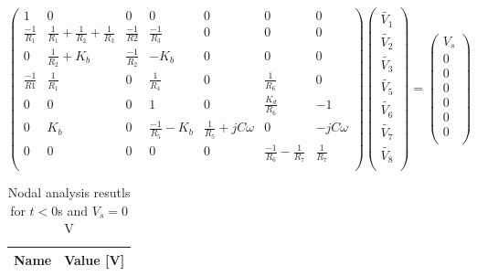 \begin{equation}
\begin{pmatrix}
1 & 0 & 0 & 0 & 0 & 0 & 0\\
\frac{-1}{R_1} & \frac{1}{R_1} + \frac{1}{R_2} + \frac{1}{R_3} & \frac{-1}{R2} & \frac{-1}{R_3} & 0 & 0 & 0\\
0 & \frac{1}{R_2} + K_b & \frac{-1}{R_2} & -K_b & 0 & 0 & 0\\
\frac{-1}{R1} & \frac{1}{R_1} & 0 & \frac{1}{R_4} & 0 & \frac{1}{R_6} & 0\\
0 & 0 & 0 & 1 & 0 & \frac{K_d}{R_6} & -1\\
0 & K_b & 0 & \frac{-1}{R_5} - K_b & \frac{1}{R_5} + jC\omega & 0 & -jC\omega\\
0 & 0 & 0 & 0 & 0 & \frac{-1}{R_6} - \frac{1}{R_7} & \frac{1}{R_7}\\


\end{pmatrix}
\begin{pmatrix}
\tilde{V_1}\\
\tilde{V_2}\\
\tilde{V_3}\\
\tilde{V_5}\\
\tilde{V_6}\\
\tilde{V_7}\\
\tilde{V_8}\\
\end{pmatrix}
=
\begin{pmatrix}
V_s\\
0\\
0\\
0\\
0\\
0\\
0\\
\end{pmatrix}
\label{eq:MatrixKCL}
\end{equation}

\begin{table}[h!]
  \centering
  \begin{tabular}{|l|r|}
    \hline    
    {\bf Name} & {\bf Value [V]} \\ \hline
    
    \hline
  \end{tabular}
  \caption{Nodal analysis resutls for $t < 0$s and $V_s = 0$V }
  \label{tab:Nodal2}
\end{table}



